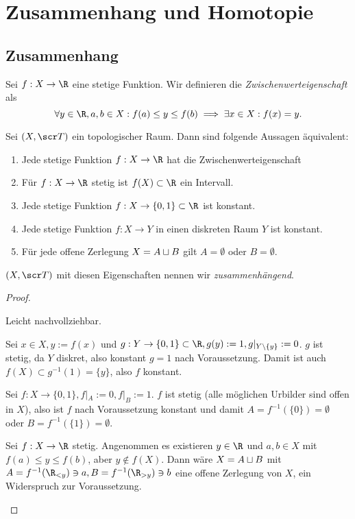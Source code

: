 \chapter{Zusammenhang und Homotopie}


\section{Zusammenhang}

\begin{df} \label{df:intermediate_value_property}
	Sei $f: X \to \R$ eine stetige Funktion.
	Wir definieren die \emph{Zwischenwerteigenschaft} als
	\[
		\forall y \in \R, a,b \in X: f(a) \le y \le f(b) \implies \exists x \in X : f(x) = y.
	\]
\end{df}

\begin{st}
	Sei $(X, \scr T)$ ein topologischer Raum.
	Dann sind folgende Aussagen äquivalent:
	\begin{enumerate}[(1)]
		\item
			Jede stetige Funktion $f: X \to \R$ hat die Zwischenwerteigenschaft
		\item
			Für $f: X \to \R$ stetig ist $f(X) \subset \R$ ein Intervall.
		\item
			Jede stetige Funktion $f: X \to \{0,1\} \subset \R$ ist konstant.
		\item
			Jede stetige Funktion $f: X \to Y$ in einen diskreten Raum $Y$ ist konstant.
		\item
			Für jede offene Zerlegung $X = A \sqcup B$ gilt $A = \emptyset$ oder $B = \emptyset$.
	\end{enumerate}
	$(X, \scr T)$ mit diesen Eigenschaften nennen wir \emph{zusammenhängend}.
	\begin{proof}
		\begin{segnb}
			Leicht nachvollziehbar.
		\end{segnb}
		\begin{segnb}[„$(3)\implies(4)$“]
			Sei $x\in X, y := f(x)$ und $g: Y \to \{0,1\} \subset \R, g(y) := 1, g|_{Y\setminus \{y\}} := 0$.
			$g$ ist stetig, da $Y$ diskret, also konstant $g = 1$ nach Voraussetzung.
			Damit ist auch $f(X) \subset g^{-1}(1) = \{y\}$, also $f$ konstant.
		\end{segnb}
		\begin{segnb}[„$(4)\implies(5)$“]
			Sei $f : X \to \{0,1\}, f|_A := 0, f|_B := 1$.
			$f$ ist stetig (alle möglichen Urbilder sind offen in $X$), also ist $f$ nach Voraussetzung konstant und damit $A = f^{-1}(\{0\}) = \emptyset$ oder $B = f^{-1}(\{1\}) = \emptyset$.
		\end{segnb}
		\begin{segnb}[„$(5)\implies(1)$“]
			Sei $f: X \to \R$ stetig.
			Angenommen es existieren $y\in \R$ und $a,b \in X$ mit $f(a) \le y \le f(b)$, aber $y \not\in f(X)$.
			Dann wäre $X = A \sqcup B$ mit $A = f^{-1}(\R_{<y}) \ni a, B = f^{-1}(\R_{>y}) \ni b$ eine offene Zerlegung von $X$, ein Widerspruch zur Voraussetzung.
		\end{segnb}
	\end{proof}
\end{st}

